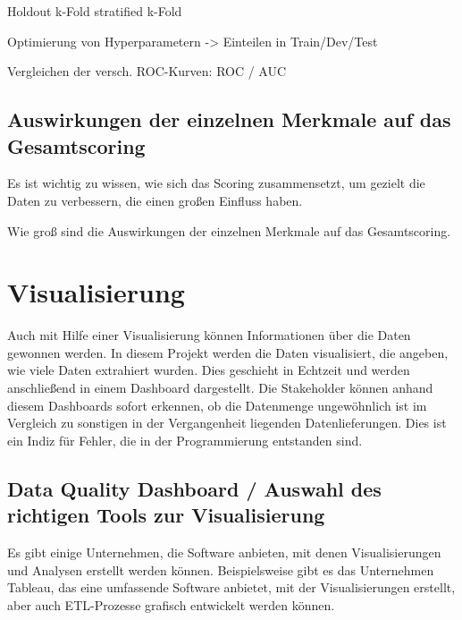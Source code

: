 Holdout
k-Fold
stratified k-Fold

Optimierung von Hyperparametern 
-> Einteilen in Train/Dev/Test

Vergleichen der versch. ROC-Kurven:
ROC / AUC


\subsection{Auswirkungen der einzelnen Merkmale auf das Gesamtscoring}
Es ist wichtig zu wissen, wie sich das Scoring zusammensetzt, um gezielt die Daten zu verbessern, die einen großen Einfluss haben. 

Wie groß sind die Auswirkungen der einzelnen Merkmale auf das Gesamtscoring. 

\section{Visualisierung}
Auch mit Hilfe einer Visualisierung können Informationen über die Daten gewonnen werden.
In diesem Projekt werden die Daten visualisiert, die angeben, wie viele Daten extrahiert wurden.
Dies geschieht in Echtzeit und werden anschließend in einem Dashboard dargestellt.
Die Stakeholder können anhand diesem Dashboards sofort erkennen, ob die Datenmenge ungewöhnlich ist im Vergleich zu sonstigen in der Vergangenheit liegenden Datenlieferungen.
Dies ist ein Indiz für Fehler, die in der Programmierung entstanden sind.


\subsection{Data Quality Dashboard / Auswahl des richtigen Tools zur Visualisierung}


Es gibt einige Unternehmen, die Software anbieten, mit denen Visualisierungen und Analysen erstellt werden können. 
Beispielsweise gibt es das Unternehmen Tableau, das eine umfassende Software anbietet, mit der Visualisierungen erstellt, aber auch ETL-Prozesse grafisch entwickelt werden können.  
\cite{https://www.tableau.com/de-de/why-tableau/what-is-tableau}

